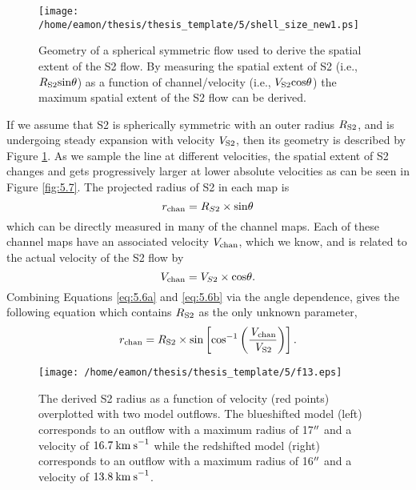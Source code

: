 \begin{figure}[!ht]
\centering 
\texttt{[image: /home/eamon/thesis/thesis\_template/5/shell\_size\_new1.ps]}
\caption[Geometry of a spherical symmetric flow]{Geometry of a spherical symmetric flow used to derive the spatial extent of the S2 flow. By measuring the spatial extent of S2 (i.e., $R_{\rm{S2}}\rm{sin}\theta$) as a function of channel/velocity (i.e., $V_{\rm{S2}}\rm{cos}\theta$) the maximum spatial extent of the S2 flow can be derived.}
\label{fig:5.8}
\end{figure}

If we assume that S2 is spherically symmetric with an outer radius $R_{\rm{S2}}$, and is undergoing steady expansion with velocity $V_{\rm{S2}}$, then its geometry is described by Figure \ref{fig:5.8}. As we sample the line at different velocities, the spatial extent of S2 changes and gets progressively larger at lower absolute velocities as can be seen in Figure \ref{fig:5.7}. The projected radius of S2 in each map is
\begin{equation}
r_{\rm{chan}}=R_{S2}\times \rm{sin}\mathrm{\theta}
\label{eq:5.6a}
\end{equation}
which can be directly measured in many of the channel maps. Each of these channel maps have an associated velocity $V_{\rm{chan}}$, which we know, and is related to the actual velocity of the S2 flow by
\begin{equation}
V_{\rm{chan}}=V_{S2}\times \rm{cos}\mathrm{\theta}.
\label{eq:5.6b}
\end{equation}
Combining Equations \ref{eq:5.6a} and \ref{eq:5.6b} via the angle dependence, gives the following equation which contains $R_{\rm{S2}}$ as the only unknown parameter,
\begin{equation}
r_{\rm{chan}}= R_{\rm{S2}}\times \rm{sin}\left[\rm{cos}^{-1}\left(\frac{\mathit{V}_{chan}}{\mathit{V}_{S2}}\right) \right].
\label{eq:5.6c}
\end{equation} 

\begin{figure}[!ht]
\centering 
\texttt{[image: /home/eamon/thesis/thesis\_template/5/f13.eps]}
\caption[S2 radius as a function of channel velocity]{The derived S2 radius as a function of velocity (red points) overplotted with two model outflows. The blueshifted model (left) corresponds to an outflow with a maximum radius of 17$^{\prime\prime}$ and a velocity of $16.7\>{\rm km\>s}^{-1}$ while the redshifted model (right) corresponds to an outflow with a maximum radius of 16$^{\prime\prime}$ and a velocity of $13.8\>{\rm km\>s}^{-1}$.}
\label{fig:5.10}
\end{figure}


